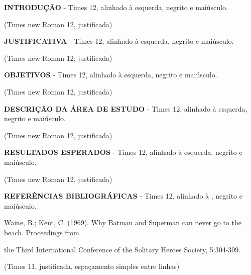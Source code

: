\documentclass[a4paper,10pt]{article}
\begin{document}
  \vspace{1ex}
  \noindent
  \textbf{INTRODUÇÃO} - Times 12, alinhado à esquerda, negrito e maiúsculo.
  
  (Times new Roman 12, justificada)

  \vspace{1ex}
  \noindent
  \textbf{JUSTIFICATIVA} - Times 12, alinhado à esquerda, negrito e maiúsculo.
  
  (Times new Roman 12, justificada)
  
  \noindent
  \textbf{OBJETIVOS} - Times 12, alinhado à esquerda, negrito e maiúsculo.
  
  (Times new Roman 12, justificada)
  
  \vspace{1ex}
  \noindent
  \textbf{DESCRIÇÃO DA ÁREA DE ESTUDO} - Times 12, alinhado à esquerda, negrito e maiúsculo.
  
  (Times new Roman 12, justificada)
    
  \vspace{1ex} 
  \noindent
  \textbf{RESULTADOS ESPERADOS} - Times 12, alinhado à esquerda, negrito e maiúsculo.
  
  (Times new Roman 12, justificada)

  \vspace{1ex}
  \noindent
  \textbf{REFERÊNCIAS BIBLIOGRÁFICAS} - Times 12, alinhado à , negrito e maiúsculo.
  
  \vspace{1ex}
  \noindent
  Waine, B.; Kent, C. (1969). Why Batman and Superman can never go to the beach. Proceedings from 
  
  the Third International Conference of the Solitary Heroes Society, 5:304-309.
  
  (Times 11, justificada, espaçamento simples entre linhas) 



\end{document}
